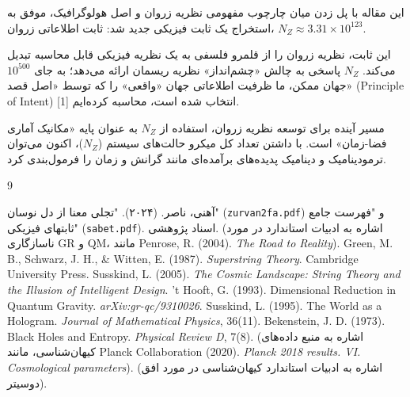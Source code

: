 \documentclass[11pt, a4paper, twocolumn]{article} %
\begin{document}
این مقاله با پل زدن میان چارچوب مفهومی نظریه زروان و اصل هولوگرافیک، موفق به استخراج یک ثابت فیزیکی جدید شد: ثابت اطلاعاتی زروان، $N_Z \approx 3.31 \times 10^{123}$.

این ثابت، نظریه زروان را از قلمرو فلسفی به یک نظریه فیزیکی قابل محاسبه تبدیل می‌کند. $N_Z$ پاسخی به چالش «چشم‌انداز» نظریه ریسمان ارائه می‌دهد؛ به جای $10^{500}$ جهان ممکن، ما ظرفیت اطلاعاتی جهان «واقعی» را که توسط «اصل قصد» (Principle of Intent) [1] انتخاب شده است، محاسبه کرده‌ایم.

مسیر آینده برای توسعه نظریه زروان، استفاده از $N_Z$ به عنوان پایه «مکانیک آماری فضا-زمان» است. با داشتن تعداد کل میکرو حالت‌های سیستم ($N_Z$)، اکنون می‌توان ترمودینامیک و دینامیک پدیده‌های برآمده‌ای مانند گرانش و زمان را فرمول‌بندی کرد.

\begin{thebibliography}{9}

 آهنی، ناصر. (۲۰۲۴). "تجلی معنا از دل نوسان" (\texttt{zurvan2fa.pdf}) و "فهرست جامع ثابتهای فیزیکی" (\texttt{sabet.pdf}). اسناد پژوهشی.
 (اشاره به ادبیات استاندارد در مورد ناسازگاری GR و QM، مانند Penrose, R. (2004). \textit{The Road to Reality}).
 Green, M. B., Schwarz, J. H., \& Witten, E. (1987). \textit{Superstring Theory}. Cambridge University Press.
 Susskind, L. (2005). \textit{The Cosmic Landscape: String Theory and the Illusion of Intelligent Design}.
 't Hooft, G. (1993). Dimensional Reduction in Quantum Gravity. \textit{arXiv:gr-qc/9310026}.
 Susskind, L. (1995). The World as a Hologram. \textit{Journal of Mathematical Physics}, 36(11).
 Bekenstein, J. D. (1973). Black Holes and Entropy. \textit{Physical Review D}, 7(8).
 (اشاره به منبع داده‌های کیهان‌شناسی، مانند Planck Collaboration (2020). \textit{Planck 2018 results. VI. Cosmological parameters}).
 (اشاره به ادبیات استاندارد کیهان‌شناسی در مورد افق دوسیتر).
\end{thebibliography}
\end{document}
